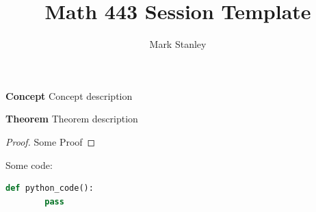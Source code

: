 \documentclass[11pt]{article}
\author{Mark Stanley}
\title{Math 443 Session Template}
\begin{document}
    \lstset{style=mystyle}

    \maketitle

    \textbf{Concept}
    Concept description

    \textbf{Theorem}
    Theorem description

    \begin{proof}
        Some Proof
    \end{proof}

    Some code:
    \begin{lstlisting}[language=Python]
    def python_code():
        pass
    \end{lstlisting}
\end{document}
